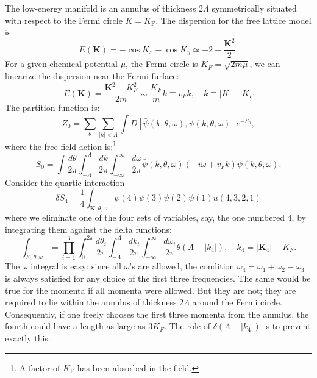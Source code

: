 The low-energy manifold is an annulus of thickness $2 \Lambda$ symmetrically situated with respect to the Fermi circle $K=K_{\mathrm{F}}$.
The dispersion for the free lattice model is
\begin{equation}
	E(\bm K) = -\cos K_x - \cos K_y \simeq -2 + \frac{\bm K^2}{2}.
\end{equation}
For a given chemical potential $\mu$, the Fermi circle is $K_F = \sqrt{2m\mu}$, we can linearize the dispersion near the Fermi furface:
\begin{equation}
	E(\bm K) = \frac{\bm K^2-K_F^2}{2m} \eqsim \frac{K_F}{m}k \equiv v_F k, \quad
	k\equiv |K|-K_F
\end{equation}
The partition function is:
\begin{equation}
	Z_0 = \sum_\theta \sum_{|k|<\Lambda}\int D\left[\bar\psi(k,\theta,\omega),\psi(k,\theta,\omega)\right] e^{-S_0},
\end{equation}
where the free field action is:\footnote{A factor of $K_{\mathrm{F}}$ has been absorbed in the field.}
\begin{equation}
	S_0 = \int \frac{d\theta}{2\pi} \int^\Lambda_{-\Lambda}\frac{dk}{2\pi} \int^\infty_{-\infty}\frac{d\omega}{2\pi} \bar\psi(k,\theta,\omega)(-i\omega+v_F k)\psi(k,\theta,\omega).
\end{equation}
Consider the quartic interaction
\begin{equation}
	\delta S_4 = \frac{1}{4}\int_{\bm K,\theta,\omega} \bar\psi(4)\bar\psi(3)\psi(2)\psi(1)u(4,3,2,1)
\end{equation}
where we eliminate one of the four sets of variables, say, the one numbered 4, by integrating them against the delta functions:
\begin{equation}
	\int_{K,\theta,\omega}
	=\prod_{i=1}^{3} \int_{0}^{2 \pi} \frac{d \theta_{i}}{2 \pi} \int_{-\Lambda}^{\Lambda} \frac{d k_{i}}{2 \pi} \int_{-\infty}^{\infty} \frac{d \omega_{i}}{2 \pi} \theta\left(\Lambda-\left|k_{4}\right|\right), \quad 
	k_4 = |\bm K_4|-K_F.
\end{equation}
The $\omega$ integral is easy: since all $\omega$'s are allowed, the condition $\omega_4=\omega_1+\omega_2-\omega_3$ is always satisfied for any choice of the first three frequencies. 
The same would be true for the momenta if all momenta were allowed. 
But they are not; they are required to lie within the annulus of thickness $2\Lambda$ around the Fermi circle. 
Consequently, if one freely chooses the first three momenta from the annulus, the fourth could have a length as large as $3K_F$. 
The role of $\delta(\Lambda-|k_4|)$ is to prevent exactly this.

